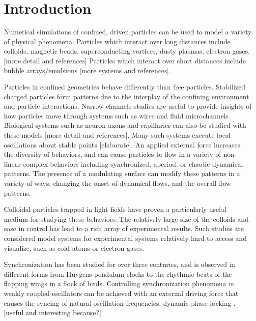 \documentclass[prb,preprint]{revtex4}
\begin{document}
\section{Introduction} %
%
Numerical simulations of confined, driven particles
can be used to model a variety of physical phenomena.
Particles which interact over long distances
include colloids, magnetic beads, superconducting vortices, dusty plasmas, electron gases. [more detail and references]
Particles which interact over short distances include
bubble arrays/emulsions [more systems and references].

Particles in confined geometries behave differently than free particles.
Stabilized charged particles form patterns
due to the interplay of the confining environment
and particle interactions.
Narrow channels studies are useful to provide insights 
of how particles move through systems 
such as wires and fluid microchannels.
Biological systems such as
neuron axons and capillaries can also be studied
with these models [more detail and references].
Many such systems execute local oscillations
about stable points [elaborate].
An applied external force
increases the diversity of behaviors,
and can cause particles to flow in
a variety of non-linear complex behaviors
including
synchronized, aperiod, or chaotic dynamical patterns.
%
The presence of a modulating surface
can modify these patterns in a variety of ways,
changing the onset of dynamical flows,
and the overall flow patterns.

Colloidal particles trapped in light fields have proven
a particularly useful medium for studying these behaviors.%
The relatively large size of the colloids
and ease in control has lead to a rich array of 
experimental results. %
Such studies are considered model systems
for experimental systems relatively hard to access and visualize,
such as cold atoms or electron gases. %

Synchronization has been studied for over three centuries,
and is observed in different forms
from Huygens pendulum clocks
to the rhythmic beats of the flapping wings in a flock of birds.
Controlling
synchronization phenomena in weakly coupled oscillators
can be achieved with an external driving force
that causes the syncing of natural oscillation frequencies,
dynamic phase locking \cite{juniper2015}.
[useful and interesting because?]
\end{document}

